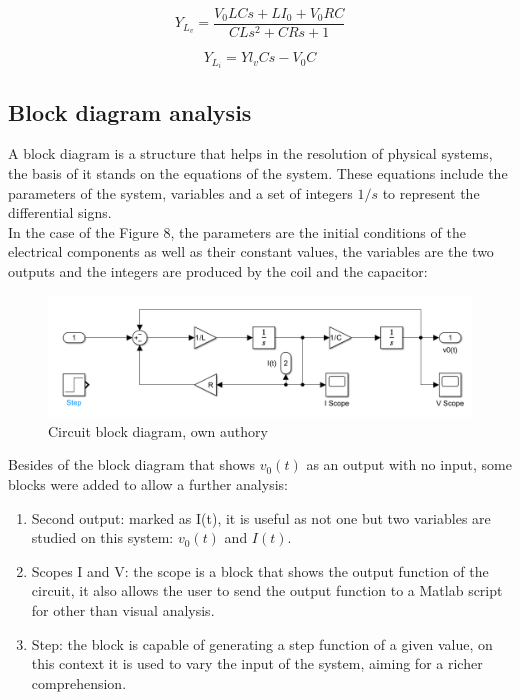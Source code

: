 \documentclass[a4paper,12pt]{article}
\begin{document}
\begin{equation}
    Y_{L_v} = \frac{V_0LCs + LI_0 + V_0RC}{CLs^2 + CRs + 1}
\end{equation}

\vspace{0.5cm}

\begin{equation}
    Y_{L_i} = Yl_vCs - V_0C
\end{equation}

\vspace{0.5cm}

\subsection{Block diagram analysis}

\vspace{0.5cm}

A block diagram is a structure that helps in the resolution of physical systems, the basis of it stands on the equations of the system. These equations include the parameters of the system, variables and a set of integers $1/s$ to represent the differential signs.\\ In the case of the Figure 8, the parameters are the initial conditions of the electrical components as well as their constant values, the variables are the two outputs and the integers are produced by the coil and the capacitor:

\vspace{0.5cm}

\begin{figure}[H]
    \centering
    \includegraphics[width=0.75\linewidth]{fonts_lab_2/block_diagram.png}
    \caption{Circuit block diagram, own authory}
    \label{fig:Lab 2 circuit}
\end{figure}

\vspace{0.5cm}

Besides of the block diagram that shows $v_0(t)$ as an output with no input, some blocks were added to allow a further analysis:

\begin{enumerate}
    \item Second output: marked as I(t), it is useful as not one but two variables are studied on this system: $v_0(t)$ and $I(t)$.

    \item Scopes I and V: the scope is a block that shows the output function of the circuit, it also allows the user to send the output function to a Matlab script for other than visual analysis.

    \item Step: the block is capable of generating a step function of a given value, on this context it is used to vary the input of the system, aiming for a richer comprehension.
\end{enumerate}
\end{document}
